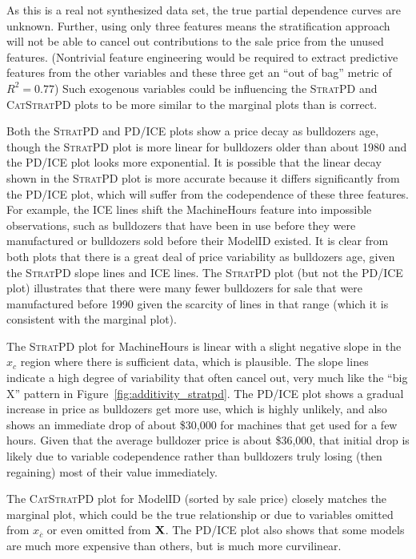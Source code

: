 \documentclass[12pt]{article}
\newcommand{\figref}[1]{Figure~\ref{#1}}
\newcommand{\spd}{\fontfamily{cmr}\textsc{\small StratPD}}
\newcommand{\cspd}{\fontfamily{cmr}\textsc{\small CatStratPD}}
\newcommand{\xnc}{$x_{\overline{c}}$}
\begin{document}
As this is a real not synthesized data set, the true partial dependence curves are unknown. Further, using only three features means the stratification approach will not be able to cancel out contributions to the sale price from the unused features. (Nontrivial feature engineering would be required to extract predictive features from the other variables and these three get an ``out of bag'' metric of $R^2=0.77$) Such exogenous variables could be influencing the \spd{} and \cspd{} plots to be more similar to the marginal plots than is correct.

Both the \spd{} and PD/ICE plots show a price decay as bulldozers age, though the \spd{} plot is more linear for bulldozers older than about 1980 and the PD/ICE plot looks more exponential. It is possible that the linear decay shown in the \spd{} plot is more accurate because it differs significantly from the PD/ICE plot, which will suffer from the codependence of these three features. For example, the ICE lines shift the MachineHours feature into impossible observations, such as bulldozers that have been in use before they were manufactured or bulldozers sold before their ModelID existed. It is clear from both plots that there is a great deal of price variability as bulldozers age, given the \spd{} slope lines and ICE lines.  The \spd{} plot (but not the PD/ICE plot) illustrates that there were many fewer bulldozers for sale that were manufactured before 1990 given the scarcity of lines in that range (which it is consistent with the marginal plot).

The \spd{} plot for MachineHours is linear with a slight negative slope in the $x_c$ region where there is sufficient data, which is plausible.  The slope lines indicate a high degree of variability that often cancel out, very much like the ``big X'' pattern in \figref{fig:additivity_stratpd}. The PD/ICE plot shows a gradual increase in price as bulldozers get more use, which is highly unlikely, and also shows an immediate drop of about \$30,000 for machines that get used for a few hours. Given that the average bulldozer price is about \$36,000, that initial drop is likely due to variable codependence rather than bulldozers truly losing (then regaining) most of their value immediately.

The \cspd{} plot for ModelID (sorted by sale price) closely matches the marginal plot, which could be the true relationship or due to variables omitted from \xnc{} or even omitted from $\bf X$. The PD/ICE plot also shows that some models are much more expensive than others, but is much more curvilinear.
\end{document}
